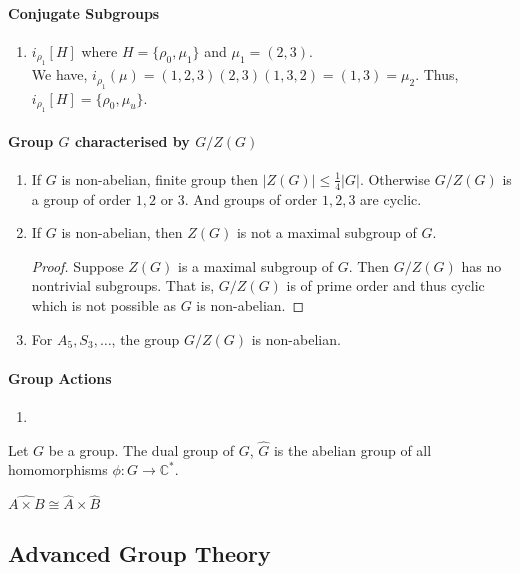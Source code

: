 \paragraph{Conjugate Subgroups}
\begin{enumerate}
	\item $i_{\rho_1}[H]$ where $H = \{ \rho_0, \mu_1 \}$ and $\mu_1 = (2,3)$.\\
	We have, $i_{\rho_1}(\mu) = (1,2,3)(2,3)(1,3,2)=(1,3) = \mu_2$.
	Thus, $i_{\rho_1}[H] = \{ \rho_0, \mu_u \}$.
\end{enumerate}

\paragraph{Group $G$ characterised by $G/Z(G)$}
\begin{enumerate}
	\item If $G$ is non-abelian, finite group then $|Z(G)| \le \frac{1}{4}|G|$. Otherwise $G/Z(G)$ is a group of order $1,2$ or $3$. And groups of order $1,2,3$ are cyclic.
	\item If $G$ is non-abelian, then $Z(G)$ is not a maximal subgroup of $G$.
	\begin{proof}
		Suppose $Z(G)$ is a maximal subgroup of $G$.
		Then $G/Z(G)$ has no nontrivial subgroups.
		That is, $G/Z(G)$ is of prime order and thus cyclic which is not possible as $G$ is non-abelian.
	\end{proof}
	\item For $A_5,S_3,\dots$, the group $G/Z(G)$ is non-abelian.
\end{enumerate}

\paragraph{Group Actions}
\begin{enumerate}
	\item 
\end{enumerate}

\begin{definition}
	Let $G$ be a group. The dual group of $G$, $\hat{G}$ is the abelian group of all homomorphisms $\phi : G \to \mathbb{C}^\ast$.
\end{definition}
	$\widehat{A \times B} \cong \hat{A} \times \hat{B}$

\subsection{Advanced Group Theory}
